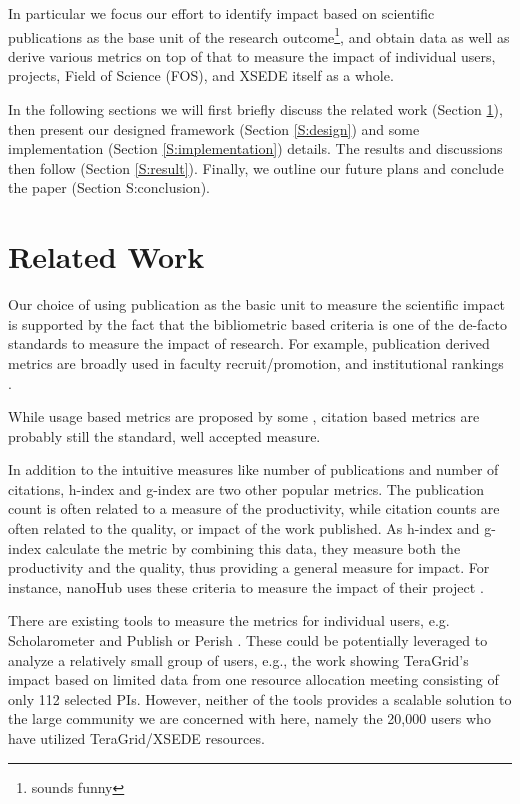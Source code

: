 \documentclass{sig-alternate}
\begin{document}
In particular we focus our effort to identify impact based on scientific publications as the base unit of the research outcome\footnote{sounds funny}, and obtain data as well as derive various metrics on top of that to measure the impact of individual users, projects, Field of Science (FOS), and XSEDE itself as a whole. 
 
In the following sections we will first briefly discuss the related work (Section \ref{S:related}), then present our designed framework (Section \ref{S:design}) and some implementation (Section \ref{S:implementation}) details. The results and discussions then follow (Section \ref{S:result}). Finally, we outline our future plans and conclude the paper (Section {S:conclusion}). 
 
 
 
\section{Related Work} \label{S:related}
 
Our choice of using publication as the basic unit to measure the scientific impact is supported by the fact that the bibliometric based criteria is one of the de-facto standards to measure the impact of research. For example, publication derived metrics are broadly used in faculty recruit/promotion, and institutional rankings \cite{thomas1998institutional}. 
 
While usage based metrics are proposed by some \cite{Bollen:2007:MUM:1255175.1255273,Bollen:2008:TUI:1378889.1378928, bollen2009principal}, citation based metrics are probably still the standard, well accepted measure. 

In addition to the intuitive measures like number of publications and number of citations, h-index \cite{hirsch2005index} and g-index \cite{egghe2006theory} are two other popular metrics. The publication count is often related to a measure of the productivity, while citation counts are often related to the quality, or impact of the work published. As h-index and g-index calculate the metric by combining this data, they measure both the productivity and the quality, thus providing a general measure for impact. For instance, nanoHub uses these criteria to measure the impact of their project \cite{www-nanohubcite}.
 
There are existing tools to measure the metrics for individual users, e.g. Scholarometer \cite{kaur2012scholarometer} and Publish or Perish \cite{www-pop}. These could be potentially leveraged to analyze a relatively small group of users, e.g., the work \cite{bollen2011and} showing TeraGrid's impact based on limited data from one resource allocation meeting consisting of  only 112 selected PIs. 
However, neither of the tools provides a scalable solution to the large community we are concerned with here, namely the 20,000 users who have utilized TeraGrid/XSEDE resources.  
 
\end{document}
